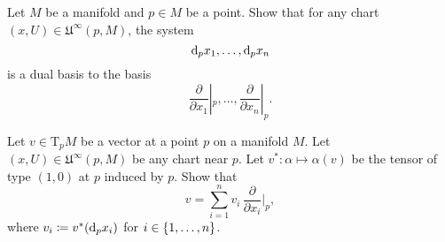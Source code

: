 \begin{xca}
  Let $M$ be a manifold and $p \in M$ be a point. Show that for any chart
  $(x, U) \in \mathfrak U^\infty(p, M)$, the system
  \[
    \mathrm d_p x_1, \dotsc, \mathrm d_p x_n
  \]
  is a dual basis to the basis
  \[
    \frac{\partial}{\partial x_1}|_p,
    \dotsc, \frac{\partial}{\partial x_n}|_p.
  \]
\end{xca}

\begin{xca}
  Let $v \in \mathrm T_p M$ be a vector at a point $p$ on a manifold $M$. Let
  $(x, U) \in \mathfrak U^\infty(p, M)$ be any chart near $p$. Let
  $v^*\colon \alpha \mapsto \alpha(v)$ be the tensor of type $(1, 0)$ at $p$
  induced by $p$.
  Show that
  \[
    v = \sum_{i = 1}^n v_i \, \frac{\partial}{\partial x_i}|_p,
  \]
  where $v_i \coloneqq v^*(\mathrm d_p x_i)$ for $i \in \lbrace1, \dotsc, n\rbrace$.
\end{xca}

